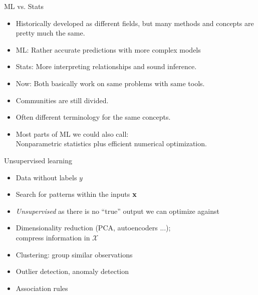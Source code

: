 \documentclass[11pt,compress,t,notes=noshow, xcolor=table]{beamer}
\begin{document}

\begin{frame}{ML vs. Stats}


\begin{itemize}
	\item Historically developed as different fields, but many
      methods and concepts are pretty much the same.
	\item ML: Rather accurate predictions with more complex models
    \item Stats: More interpreting relationships and sound inference.
	\item Now: Both basically work on same problems with same tools.
    \item Communities are still divided.
    \item Often different terminology for the same concepts.
    \item Most parts of ML we could also call:\\Nonparametric statistics plus efficient numerical optimization.
\end{itemize}

\end{frame}


\begin{vbframe}{Unsupervised learning}
\begin{itemize}
  \item Data without labels $y$
  \item Search for patterns within the inputs $\mathbf{x}$
  \item \textit{Unsupervised} as there is no ``true'' output
      we can optimize against
\end{itemize}

\vspace{1em}

{
\vspace{2em}
\begin{itemize}
    \item Dimensionality reduction (PCA, autoencoders ...);\\ 
        compress information in $\mathcal X$
    \item Clustering: group similar observations
    \item Outlier detection, anomaly detection
    \item Association rules
\end{itemize}

}
\end{vbframe}
\end{document}
